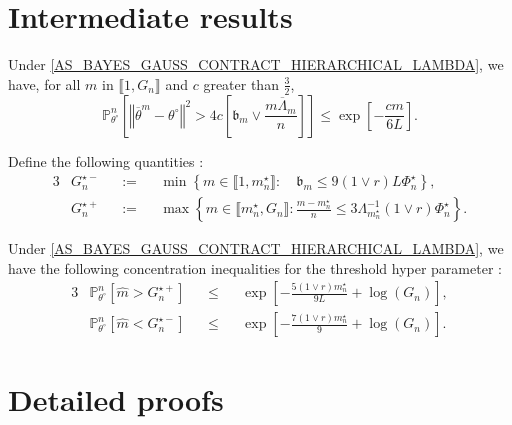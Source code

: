\section{Intermediate results}

\begin{pr}\label{prB.2.1}
Under \textsc{\cref{AS_BAYES_GAUSS_CONTRACT_HIERARCHICAL_LAMBDA}}, we have, for all $m$ in $\llbracket 1, G_{n} \rrbracket$ and $c$ greater than $\frac{3}{2}$,
\[\mathds{P}_{\theta^{\circ}}^{n}\left[\left\Vert \overline{\theta}^{m} - \theta^{\circ} \right\Vert^{2} > 4 c \left[\mathfrak{b}_{m} \vee \frac{m \overline{\Lambda}_{m}}{n}\right]\right] \leq \exp\left[-\frac{c m}{6 L}\right].\]
\end{pr}

\begin{de}\label{deB.2.1}
Define the following quantities :
\begin{alignat*}{3}
&G_{n}^{\star-} && := && \min\left\{m \in \llbracket 1, m_{n}^{\star} \rrbracket : \quad \mathfrak{b}_{m} \leq 9 \left(1 \vee r\right) L \Phi_{n}^{\star}\right\},\\
& G_{n}^{\star+} && := && \max \left\{m \in \llbracket m_{n}^{\star}, G_{n} \rrbracket : \frac{m - m_{n}^{\star}}{n} \leq 3 \Lambda_{m_{n}^{\star}}^{-1} \left(1 \vee r \right) \Phi_{n}^{\star}\right\}.
\end{alignat*}
\end{de}

\begin{pr}\label{prB.2.2}
Under \textsc{\cref{AS_BAYES_GAUSS_CONTRACT_HIERARCHICAL_LAMBDA}}, we have the following concentration inequalities for the threshold hyper parameter :
\begin{alignat*}{3}
& \mathds{P}_{\theta^{\circ}}^{n}\left[\widehat{m} > G_{n}^{\star+}\right] && \leq && \exp\left[- \frac{5 \left(1 \vee r\right) m_{n}^{\star}}{9 L} + \log \left(G_{n}\right)\right],\\
& \mathds{P}_{\theta^{\circ}}^{n}\left[\widehat{m} < G_{n}^{\star-}\right] && \leq && \exp\left[- \frac{7 \left(1 \vee r\right) m_{n}^{\star}}{9} + \log \left(G_{n}\right)\right].
\end{alignat*}
\end{pr}

\section{Detailed proofs}

